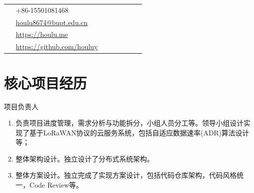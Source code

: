 \documentclass[10pt]{article} %
\makeatletter
\newcommand{\email}{houlu8674@bupt.edu.cn}
\newcommand{\website}{https://houlu.me}
\newcommand{\github}{https://github.com/houluy}
\newcommand{\red}[1]{{\color{headings}{#1}}}
\makeatother
\begin{document}
\begin{paracol}{2}
	\switchcolumn
	\parbox[top][0.12\textheight][c]{\linewidth}{ %
		\vspace{-0.04\textheight} %
		\colorbox{shade}{ %
			\begin{supertabular}{p{0.05\linewidth}|p{0.775\linewidth}} %
				\raisebox{-1pt}{\faPhone} & +86-15501081468 \\ %
				\raisebox{0pt}{\small\faEnvelope} & \href{mailto:\email}{\email} \\ %
				\raisebox{-1pt}{\small\faDesktop} & \href{\website}{\website} \\ %
				\raisebox{-1pt}{\faGithub} & \href{\github}{\github} \\ %
			\end{supertabular}
		}
	}

	\section{核心项目经历}
	
	
	
	
	\chsworkposition{} %
	{} %
	{\red{I. LoRaWAN\texttrademark 系统设计与实现}}%
	{ 项目负责人} %
	{\begin{enumerate}[font=\color{headings}\bfseries]
		\item 负责项目进度管理，需求分析与功能拆分，小组人员分工等。领导小组设计实现了基于LoRaWAN\texttrademark 协议的云服务系统，包括自适应数据速率(ADR)算法设计等；
		\item 整体架构设计。独立设计了分布式系统架构。
		
		\item 整体方案设计。独立完成了实现方案设计，包括代码仓库架构，代码风格统一，Code Review等。
		

\end{enumerate}}
\end{paracol}
\end{document}
